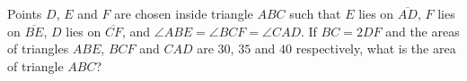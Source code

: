 Points $D$, $E$ and $F$ are chosen inside triangle $ABC$ such that $E$ lies on $\overline{AD}$, $F$ lies on $\overline{BE}$, $D$ lies on $\overline{CF}$, and $\angle ABE=\angle BCF=\angle CAD$. If $BC=2DF$ and the areas of triangles $ABE$, $BCF$ and $CAD$ are $30$, $35$ and $40$ respectively, what is the area of triangle $ABC$?
